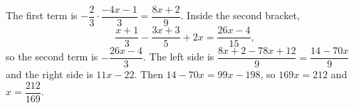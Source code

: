 The first term is $-\dfrac23\cdot\dfrac{-4x-1}{3}=\dfrac{8x+2}{9}$. Inside the second bracket,
\[\dfrac{x+1}{3}-\dfrac{3x+3}{5}+2x=\dfrac{26x-4}{15},\]
so the second term is $-\dfrac{26x-4}{3}$. The left side is $\dfrac{8x+2-78x+12}{9}=\dfrac{14-70x}{9}$ and the right side is $11x-22$. Then $14-70x=99x-198$, so $169x=212$ and $x=\boxed{\dfrac{212}{169}}$.
